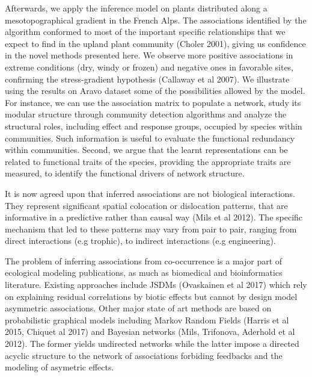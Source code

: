 \documentclass[10pt,a4paper]{article}
\begin{document}
Afterwards, we apply the inference model on plants distributed along a mesotopographical gradient in the French Alps. The associations identified by the algorithm conformed to most of the important specific relationships that we expect to find in the upland plant community (Choler 2001), giving us confidence in the novel methods presented here. We observe more positive associations in extreme conditions (dry, windy or frozen) and negative ones in favorable sites, confirming the stress-gradient hypothesis (Callaway et al 2007). We illustrate using the results on Aravo dataset some of the possibilities allowed by the model. For instance, we can use the association matrix to populate a network, study its modular structure through community detection algorithms and analyze the structural roles, including effect and response groups, occupied by species within communities. Such information is useful to evaluate the functional redundancy within communities. Second, we argue that the learnt representations can be related to functional traits of the species, providing the appropriate traits are measured, to identify the functional drivers of network structure. 

It is now agreed upon that inferred associations are not biological interactions. They represent significant spatial colocation or dislocation patterns, that are informative in a predictive rather than causal way (Mils et al 2012). The specific mechanism that led to these patterns may vary from pair to pair, ranging from direct interactions (e.g trophic), to indirect interactions (e.g engineering). 

The problem of inferring associations from co-occurrence is a major part of ecological modeling publications, as much as biomedical and bioinformatics literature. Existing approaches include JSDMs (Ovaskainen et al 2017) which rely on explaining residual correlations by biotic effects but cannot by design model asymmetric associations. Other major state of art methods are based on probabilistic graphical models including Markov Random Fields (Harris et al 2015, Chiquet al 2017) and Bayesian networks (Mils, Trifonova, Aderhold et al 2012). The former yields undirected networks while the latter impose a directed acyclic structure to the network of associations forbiding feedbacks and the modeling of asymetric effects. 
\end{document}
